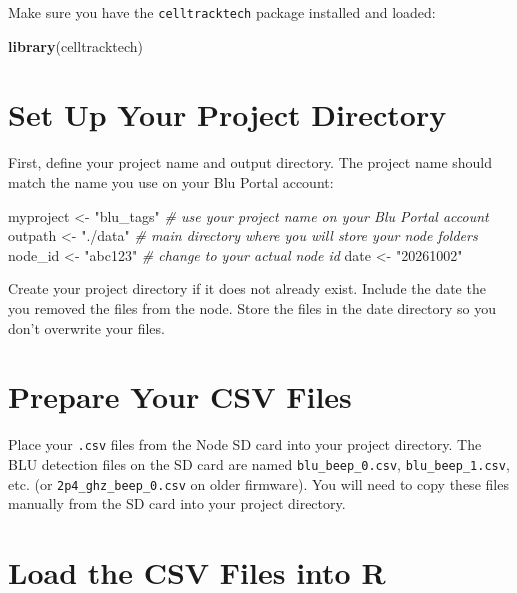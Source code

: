 \documentclass[
]{book}
\newenvironment{Shaded}{\begin{snugshade}}{\end{snugshade}}
\newcommand{\CommentTok}[1]{\textcolor[rgb]{0.56,0.35,0.01}{\textit{#1}}}
\newcommand{\FunctionTok}[1]{\textcolor[rgb]{0.13,0.29,0.53}{\textbf{#1}}}
\newcommand{\NormalTok}[1]{#1}
\newcommand{\OtherTok}[1]{\textcolor[rgb]{0.56,0.35,0.01}{#1}}
\newcommand{\StringTok}[1]{\textcolor[rgb]{0.31,0.60,0.02}{#1}}
\begin{document}
Make sure you have the \texttt{celltracktech} package installed and loaded:

\begin{Shaded}
\begin{Highlighting}[]
\FunctionTok{library}\NormalTok{(celltracktech)}
\end{Highlighting}
\end{Shaded}

\section{Set Up Your Project Directory}\label{set-up-your-project-directory}

First, define your project name and output directory. The project name should match the name you use on your Blu Portal account:

\begin{Shaded}
\begin{Highlighting}[]
\NormalTok{myproject }\OtherTok{\textless{}{-}} \StringTok{"blu\_tags"} \CommentTok{\# use your project name on your Blu Portal account}
\NormalTok{outpath }\OtherTok{\textless{}{-}} \StringTok{"./data"} \CommentTok{\# main directory where you will store your node folders}
\NormalTok{node\_id }\OtherTok{\textless{}{-}} \StringTok{"abc123"} \CommentTok{\# change to your actual node id}
\NormalTok{date }\OtherTok{\textless{}{-}} \StringTok{"20261002"}
\end{Highlighting}
\end{Shaded}

Create your project directory if it does not already exist. Include the date the you removed the files from the node. Store the files in the date directory so you don't overwrite your files.

\section{Prepare Your CSV Files}\label{prepare-your-csv-files}

Place your \texttt{.csv} files from the Node SD card into your project directory. The BLU detection files on the SD card are named \texttt{blu\_beep\_0.csv}, \texttt{blu\_beep\_1.csv}, etc. (or \texttt{2p4\_ghz\_beep\_0.csv} on older firmware). You will need to copy these files manually from the SD card into your project directory.

\section{Load the CSV Files into R}\label{load-the-csv-files-into-r}
\end{document}

